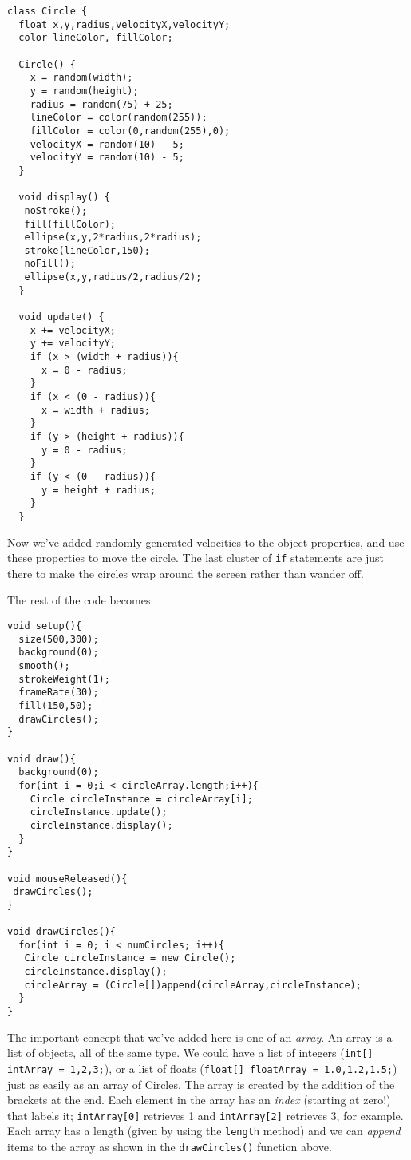 \begin{verbatim}
class Circle {
  float x,y,radius,velocityX,velocityY;
  color lineColor, fillColor;
  
  Circle() {
    x = random(width);
    y = random(height);
    radius = random(75) + 25;
    lineColor = color(random(255));
    fillColor = color(0,random(255),0);
    velocityX = random(10) - 5;
    velocityY = random(10) - 5;
  }
  
  void display() {
   noStroke();
   fill(fillColor);
   ellipse(x,y,2*radius,2*radius);
   stroke(lineColor,150);
   noFill();
   ellipse(x,y,radius/2,radius/2); 
  }  
  
  void update() {
    x += velocityX;
    y += velocityY;
    if (x > (width + radius)){
      x = 0 - radius;
    }
    if (x < (0 - radius)){
      x = width + radius;
    }
    if (y > (height + radius)){
      y = 0 - radius;
    }
    if (y < (0 - radius)){
      y = height + radius;
    }
  }
\end{verbatim}

Now we've added randomly generated velocities to the object properties, and use these properties to move the circle.  The last cluster of \texttt{if} statements are just there to make the circles wrap around the screen rather than wander off.

The rest of the code becomes:

\begin{verbatim}
void setup(){
  size(500,300);
  background(0);
  smooth();
  strokeWeight(1);
  frameRate(30);
  fill(150,50);
  drawCircles();
}

void draw(){
  background(0);
  for(int i = 0;i < circleArray.length;i++){
    Circle circleInstance = circleArray[i];
    circleInstance.update();
    circleInstance.display();
  }
}

void mouseReleased(){
 drawCircles(); 
}

void drawCircles(){
  for(int i = 0; i < numCircles; i++){
   Circle circleInstance = new Circle();
   circleInstance.display();
   circleArray = (Circle[])append(circleArray,circleInstance);
  }
}
\end{verbatim}

The important concept that we've added here is one of an \emph{array}.  An array is a list of objects, all of the same type.  We could have a list of integers (\texttt{int[] intArray = {1,2,3};}), or a list of floats (\texttt{float[] floatArray = {1.0,1.2,1.5};}) just as easily as an array of Circles.  The array is created by the addition of the brackets at the end.  Each element in the array has an \emph{index} (starting at zero!) that labels it; \texttt{intArray[0]} retrieves 1 and \texttt{intArray[2]} retrieves 3, for example.  Each array has a length (given by using the \texttt{length} method) and we can \emph{append} items to the array as shown in the \texttt{drawCircles()} function above.

